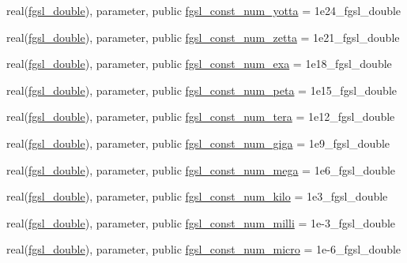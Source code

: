 \begin{DoxyCompactItemize}
real(\hyperlink{namespacefgsl_a9af5113378e0f000eb479d3f90196ddf}{fgsl\+\_\+double}), parameter, public \hyperlink{namespacefgsl_a0b9812de1b4fd0e830437a0f81756409}{fgsl\+\_\+const\+\_\+num\+\_\+yotta} = 1e24\+\_\+fgsl\+\_\+double
\item 
real(\hyperlink{namespacefgsl_a9af5113378e0f000eb479d3f90196ddf}{fgsl\+\_\+double}), parameter, public \hyperlink{namespacefgsl_adbd48c7f748a96cfbe32705159c06b84}{fgsl\+\_\+const\+\_\+num\+\_\+zetta} = 1e21\+\_\+fgsl\+\_\+double
\item 
real(\hyperlink{namespacefgsl_a9af5113378e0f000eb479d3f90196ddf}{fgsl\+\_\+double}), parameter, public \hyperlink{namespacefgsl_a0d6878f336ffcf4aaf3af66bbdfc5a9b}{fgsl\+\_\+const\+\_\+num\+\_\+exa} = 1e18\+\_\+fgsl\+\_\+double
\item 
real(\hyperlink{namespacefgsl_a9af5113378e0f000eb479d3f90196ddf}{fgsl\+\_\+double}), parameter, public \hyperlink{namespacefgsl_aa124eb86407291ed14158b0802d02029}{fgsl\+\_\+const\+\_\+num\+\_\+peta} = 1e15\+\_\+fgsl\+\_\+double
\item 
real(\hyperlink{namespacefgsl_a9af5113378e0f000eb479d3f90196ddf}{fgsl\+\_\+double}), parameter, public \hyperlink{namespacefgsl_a6b39aa71fe2d5af7fa748710f70afd58}{fgsl\+\_\+const\+\_\+num\+\_\+tera} = 1e12\+\_\+fgsl\+\_\+double
\item 
real(\hyperlink{namespacefgsl_a9af5113378e0f000eb479d3f90196ddf}{fgsl\+\_\+double}), parameter, public \hyperlink{namespacefgsl_a27758acec15033cf3c0918d8d9c55eca}{fgsl\+\_\+const\+\_\+num\+\_\+giga} = 1e9\+\_\+fgsl\+\_\+double
\item 
real(\hyperlink{namespacefgsl_a9af5113378e0f000eb479d3f90196ddf}{fgsl\+\_\+double}), parameter, public \hyperlink{namespacefgsl_a3783a70eb7db5888129ccf2094415129}{fgsl\+\_\+const\+\_\+num\+\_\+mega} = 1e6\+\_\+fgsl\+\_\+double
\item 
real(\hyperlink{namespacefgsl_a9af5113378e0f000eb479d3f90196ddf}{fgsl\+\_\+double}), parameter, public \hyperlink{namespacefgsl_a921e5869ad16238cb472943f2486d0ac}{fgsl\+\_\+const\+\_\+num\+\_\+kilo} = 1e3\+\_\+fgsl\+\_\+double
\item 
real(\hyperlink{namespacefgsl_a9af5113378e0f000eb479d3f90196ddf}{fgsl\+\_\+double}), parameter, public \hyperlink{namespacefgsl_a3fb5efe0ae67e7937ba05e8f184e2d35}{fgsl\+\_\+const\+\_\+num\+\_\+milli} = 1e-\/3\+\_\+fgsl\+\_\+double
\item 
real(\hyperlink{namespacefgsl_a9af5113378e0f000eb479d3f90196ddf}{fgsl\+\_\+double}), parameter, public \hyperlink{namespacefgsl_aa7d0f5804ffc72dc0ecddbee234cd51d}{fgsl\+\_\+const\+\_\+num\+\_\+micro} = 1e-\/6\+\_\+fgsl\+\_\+double

\end{DoxyCompactItemize}
